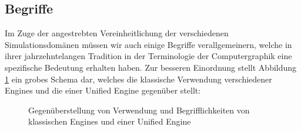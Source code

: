 	


\subsection{Begriffe}

Im Zuge der angestrebten Vereinheitlichung der  verschiedenen Simulationsdomänen müssen wir auch einige Begriffe verallgemeinern, welche in ihrer jahrzehntelangen Tradition in der Terminologie der Computergraphik eine spezifische Bedeutung erhalten haben.
Zur besseren Einordnung stellt Abbildung \ref{fig:classicalVsUnified} ein grobes Schema dar, welches die klassische Verwendung verschiedener Engines und die einer Unified Engine gegenüber stellt:



	\begin{figure}[ht]
		\def\svgwidth{\textwidth}
	    
		\caption{Gegenüberstellung von Verwendung und Begrifflichkeiten von klassischen Engines und einer Unified Engine}
		\label{fig:classicalVsUnified}
	\end{figure}
	




